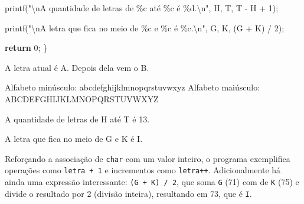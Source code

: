\documentclass[
  letterpaper,
  DIV=11,
  numbers=noendperiod]{scrartcl}
\newenvironment{Shaded}{\begin{snugshade}}{\end{snugshade}}
\newcommand{\CharTok}[1]{\textcolor[rgb]{0.13,0.47,0.30}{#1}}
\newcommand{\ControlFlowTok}[1]{\textcolor[rgb]{0.00,0.23,0.31}{\textbf{#1}}}
\newcommand{\DecValTok}[1]{\textcolor[rgb]{0.68,0.00,0.00}{#1}}
\newcommand{\NormalTok}[1]{\textcolor[rgb]{0.00,0.23,0.31}{#1}}
\newcommand{\OperatorTok}[1]{\textcolor[rgb]{0.37,0.37,0.37}{#1}}
\newcommand{\SpecialCharTok}[1]{\textcolor[rgb]{0.37,0.37,0.37}{#1}}
\newcommand{\StringTok}[1]{\textcolor[rgb]{0.13,0.47,0.30}{#1}}
\begin{document}
\begin{Shaded}
\begin{Highlighting}[]
\NormalTok{    printf}\OperatorTok{(}\StringTok{"}\SpecialCharTok{\textbackslash{}n}\StringTok{A quantidade de letras de }\SpecialCharTok{\%c}\StringTok{ até }\SpecialCharTok{\%c}\StringTok{ é }\SpecialCharTok{\%d}\StringTok{.}\SpecialCharTok{\textbackslash{}n}\StringTok{"}\OperatorTok{,}
           \CharTok{\textquotesingle{}H\textquotesingle{}}\OperatorTok{,} \CharTok{\textquotesingle{}T\textquotesingle{}}\OperatorTok{,} \CharTok{\textquotesingle{}T\textquotesingle{}} \OperatorTok{{-}} \CharTok{\textquotesingle{}H\textquotesingle{}} \OperatorTok{+} \DecValTok{1}\OperatorTok{);}

\NormalTok{    printf}\OperatorTok{(}\StringTok{"}\SpecialCharTok{\textbackslash{}n}\StringTok{A letra que fica no meio de }\SpecialCharTok{\%c}\StringTok{ e }\SpecialCharTok{\%c}\StringTok{ é }\SpecialCharTok{\%c}\StringTok{.}\SpecialCharTok{\textbackslash{}n}\StringTok{"}\OperatorTok{,}
           \CharTok{\textquotesingle{}G\textquotesingle{}}\OperatorTok{,} \CharTok{\textquotesingle{}K\textquotesingle{}}\OperatorTok{,} \OperatorTok{(}\CharTok{\textquotesingle{}G\textquotesingle{}} \OperatorTok{+} \CharTok{\textquotesingle{}K\textquotesingle{}}\OperatorTok{)} \OperatorTok{/} \DecValTok{2}\OperatorTok{);}

    \ControlFlowTok{return} \DecValTok{0}\OperatorTok{;}
\OperatorTok{\}}
\end{Highlighting}
\end{Shaded}

\begin{Shaded}
\begin{Highlighting}[]
\NormalTok{A letra atual é A. Depois dela vem o B.}

\NormalTok{Alfabeto minúsculo: abcdefghijklmnopqrstuvwxyz}
\NormalTok{Alfabeto maiúsculo: ABCDEFGHIJKLMNOPQRSTUVWXYZ}

\NormalTok{A quantidade de letras de H até T é 13.}

\NormalTok{A letra que fica no meio de G e K é I.}
\end{Highlighting}
\end{Shaded}

Reforçando a associação de \texttt{char} com um valor inteiro, o
programa exemplifica operações como \texttt{letra\ +\ 1} e incrementos
como \texttt{letra++}. Adicionalmente há ainda uma expressão
interessante:
\texttt{(\textquotesingle{}G\textquotesingle{}\ +\ \textquotesingle{}K\textquotesingle{})\ /\ 2},
que soma \texttt{\textquotesingle{}G\textquotesingle{}} (71) com de
\texttt{\textquotesingle{}K\textquotesingle{}} (75) e divide o resultado
por 2 (divisão inteira), resultando em 73, que é
\texttt{\textquotesingle{}I\textquotesingle{}}.
\end{document}
